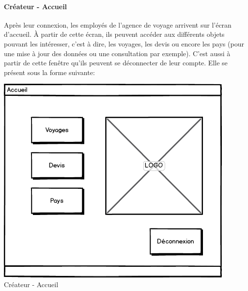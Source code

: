 \documentclass[12pt]{article}
\begin{document}
\paragraph{Créateur - Accueil}
Après leur connexion, les employés de l'agence de voyage arrivent sur l'écran d'accueil. À	partir de cette écran, ils peuvent accéder aux différents objets pouvant les intéresser, c'est à dire, les voyages, les devis ou encore les pays (pour une mise à jour des données ou une consultation par exemple). C'est aussi à partir de cette fenêtre qu'ils peuvent se déconnecter de leur compte. Elle se présent sous la forme suivante:
\begin{center}
\includegraphics[scale = 0.5]{../Conception_graphique/png_Pour_CR/Createur-10-Accueil.png}
\newline
Créateur - Accueil
\label{fig:Cr-Accueil}
\end{center}
\end{document}

